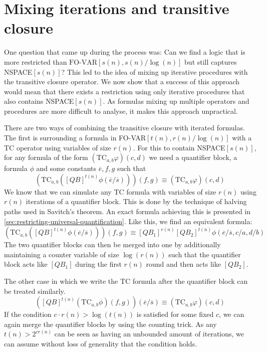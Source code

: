 \section{Mixing iterations and transitive closure}\label{sec:mixing-iterations-and-transitive-closure}

\sloppy One question that came up during the process was: Can we find a logic that is more restricted than $\text{FO-VAR}[s(n), s(n)/\log(n)]$ but still captures NSPACE$[s(n)]$?
This led to the idea of mixing up iterative procedures with the transitive closure operator.
We now show that a success of this approach would mean that there exists a restriction using only iterative procedures that also contains NSPACE$[s(n)]$.
As formulas mixing up multiple operators and procedures are more difficult to analyse, it makes this approach unpractical.

There are two ways of combining the transitive closure with iterated formulas.
The first is surrounding a formula in FO-VAR$[t(n), r(n)/\log(n)]$ with a TC operator using variables of size $r(n)$.
For this to contain NSPACE$[s(n)]$, for any formula of the form $(\text{TC}_{a, b}\varphi)(c, d)$ we need a quantifier block, a formula $\phi$ and some constants $\overline{e}, f, g$ such that
\[
    \left(\text{TC}_{a, b}\left([QB]^{t(n)}\phi(\overline{e}/\overline{s})\right)\right)(f, g) \equiv (\text{TC}_{a, b}\varphi)(c, d)
\]
We know that we can simulate any TC formula with variables of size $r(n)$ using $r(n)$ iterations of a quantifier block.
This is done by the technique of halving paths used in Savitch's theorem.
An exact formula achieving this is presented in \cref{sec:restricting-universal-quantification}.
Like this, we find an equivalent formula:
\[
    \left(\text{TC}_{a, b}\left([QB]^{t(n)}\phi(\overline{e}/\overline{s})\right)\right)(f, g) \equiv [QB_1]^{r(n)}[QB_2]^{t(n)}\phi(\overline{e}/\overline{s}, c/a, d/b)
\]
The two quantifier blocks can then be merged into one by additionally maintaining a counter variable of size $\log(r(n))$ such that the quantifier block acts like $[QB_1]$ during the first $r(n)$ round and then acts like $[QB_2]$.

The other case in which we write the TC formula after the quantifier block can be treated similarly.
\[
    \left([QB]^{t(n)}\left(\text{TC}_{a, b}\phi\right)(f, g)\right)(\overline{e}/\overline{s}) \equiv (\text{TC}_{a, b}\varphi)(c, d)
\]
If the condition $c \cdot r(n) > \log(t(n))$ is satisfied for some fixed $c$, we can again merge the quantifier blocks by using the counting trick.
As any $t(n) > 2^{cr(n)}$ can be seen as having an unbounded amount of iterations, we can assume without loss of generality that the condition holds.

